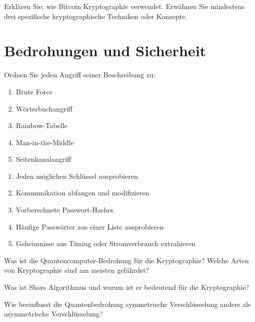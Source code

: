 \documentclass[11pt,a4paper]{report}
\begin{document}
\begin{ex}
Erklären Sie, wie Bitcoin Kryptographie verwendet. Erwähnen Sie mindestens drei spezifische kryptographische Techniken oder Konzepte.
\end{ex}

\section{Bedrohungen und Sicherheit}

\begin{ex}
Ordnen Sie jeden Angriff seiner Beschreibung zu:

\begin{enumerate}[label=\alph*)]
    \item Brute Force
    \item Wörterbuchangriff
    \item Rainbow-Tabelle
    \item Man-in-the-Middle
    \item Seitenkanalangriff
\end{enumerate}

\begin{enumerate}[label=\Roman*)]
    \item Jeden möglichen Schlüssel ausprobieren
    \item Kommunikation abfangen und modifizieren
    \item Vorberechnete Passwort-Hashes
    \item Häufige Passwörter aus einer Liste ausprobieren
    \item Geheimnisse aus Timing oder Stromverbrauch extrahieren
\end{enumerate}
\end{ex}

\begin{ex}
Was ist die Quantencomputer-Bedrohung für die Kryptographie? Welche Arten von Kryptographie sind am meisten gefährdet?
\end{ex}

\begin{ex}
Was ist Shors Algorithmus und warum ist er bedeutend für die Kryptographie?
\end{ex}

\begin{ex}
Wie beeinflusst die Quantenbedrohung symmetrische Verschlüsselung anders als asymmetrische Verschlüsselung?
\end{ex}
\end{document}
